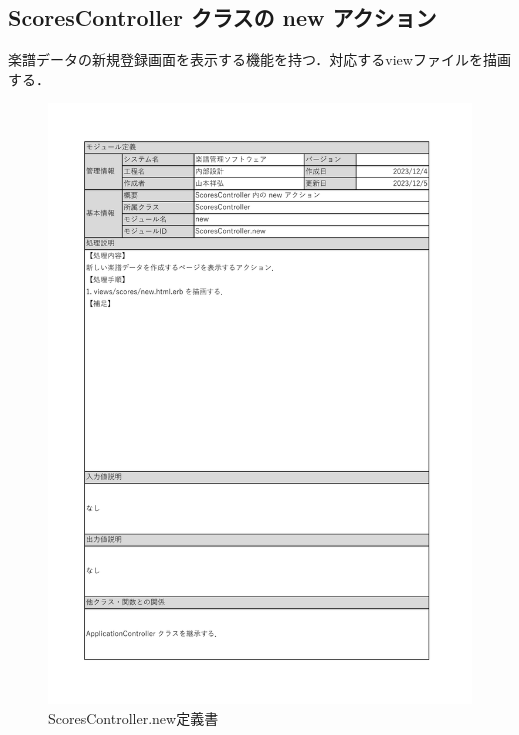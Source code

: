 \subsection*{ScoresController クラスの new アクション}
楽譜データの新規登録画面を表示する機能を持つ．対応するviewファイルを描画する．
\begin{figure}[H]
	\centering
	\includegraphics[scale=0.6]{img/Scores/xlsx/ScoresController_new.pdf}
	\vspace{-1cm}
	\caption{ScoresController.new定義書}
\end{figure}
